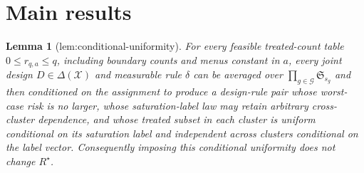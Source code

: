 \documentclass{article}
\newtheorem{lemma}{Lemma}
\begin{document}
\section{Main results}

\begin{lemma}[lem:conditional-uniformity]\label{lem:conditional-uniformity}
For every feasible treated-count table \(0\le r_{q,a}\le q\), including boundary counts and menus constant in \(a\), every joint design \(D\in\Delta(\mathcal X)\) and measurable rule \(\delta\) can be averaged over \(\prod_{g\in\mathcal G}\mathfrak S_{s_g}\) and then conditioned on the assignment to produce a design-rule pair whose worst-case risk is no larger, whose saturation-label law may retain arbitrary cross-cluster dependence, and whose treated subset in each cluster is uniform conditional on its saturation label and independent across clusters conditional on the label vector. Consequently imposing this conditional uniformity does not change \(R^\star\).
\end{lemma}
\end{document}
